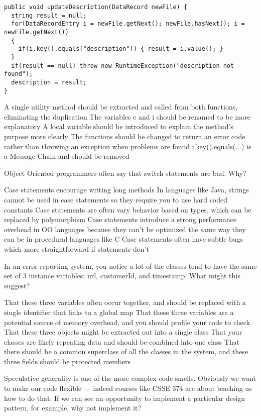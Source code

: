 \documentclass{exam}
\begin{document}
\begin{questions}
\begin{lstlisting}
public void updateDescription(DataRecord newFile) {
  string result = null;
  for(DataRecordEntry i = newFile.getNext(); newFile.hasNext(); i = newFile.getNext())
  {
    if(i.key().equals("description")) { result = i.value(); }
  }
  if(result == null) throw new RuntimeException("description not found");
  description = result;
}
\end{lstlisting}

\begin{choices}
\choice A single utility method should be extracted and called from both functions, eliminating the duplication
\choice The variables e and i should be renamed to be more explanatory
\choice A local variable should be introduced to explain the method's purpose more clearly
\choice The functions should be changed to return an error code rather than throwing an exception when problems are found
\choice i.key().equals(...) is a Message Chain and should be removed
\end{choices}

\question[1] Object Oriented programmers often say that switch statements are bad.  Why?
\begin{choices}
\choice Case statements encourage writing long methods
\choice In languages like Java, strings cannot be used in case statements so they require you to use hard coded constants
\choice Case statements are often vary behavior based on types, which can be replaced by polymorphism
\choice Case statements introduce a strong performance overhead in OO languages because they can't be optimized the same way they can be in procedural languages like C
\choice Case statements often have subtle bugs which more straightforward if statements don't
\end{choices}

\question[1] In an error reporting system, you notice a lot of the classes tend to have the same set of 3 instance variables: url, customerId, and timestamp.  What might this suggest?

\begin{choices}
\choice That these three variables often occur together, and should be replaced with a single identifier that links to a global map
\choice That these three variables are a potential source of memory overhead, and you should profile your code to check
\choice That these three objects might be extracted out into a single class
\choice That your classes are likely repeating data and should be combined into one class
\choice That there should be a common superclass of all the classes in the system, and these three fields should be protected members\
\end{choices}
\question[20]
Speculative generality is one of the more complex code smells.  Obviously we want to make our code flexible --- indeed courses like CSSE 374 are about teaching us how to do that.  If we can see an opportunity to implement a particular design pattern, for example, why not implement it?
\begin{parts}

\end{parts}
\end{questions}
\end{document}
